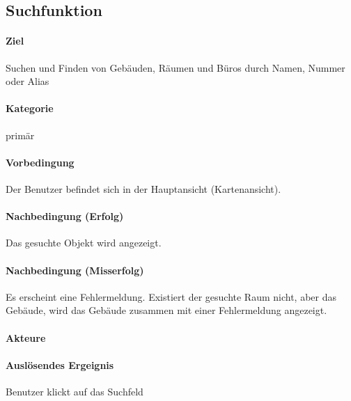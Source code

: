 \subsection{Suchfunktion}
\label{Suchfunktion}
\paragraph{Ziel}
Suchen und Finden von Gebäuden, Räumen und Büros durch Namen, Nummer oder Alias
\paragraph{Kategorie}
primär
\paragraph{Vorbedingung}
Der Benutzer befindet sich in der Hauptansicht (Kartenansicht).
\paragraph{Nachbedingung (Erfolg)}
Das gesuchte Objekt wird angezeigt.
\paragraph{Nachbedingung (Misserfolg)}
Es erscheint eine Fehlermeldung. Existiert der gesuchte Raum nicht, aber das Gebäude, wird das Gebäude zusammen mit einer Fehlermeldung angezeigt.
\paragraph{Akteure}

\paragraph{Auslösendes Ergeignis}
Benutzer klickt auf das Suchfeld
